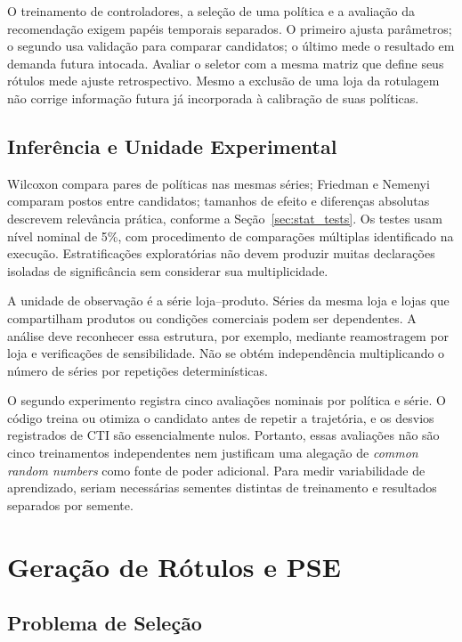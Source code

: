 O treinamento de controladores, a seleção de uma política e a avaliação da recomendação exigem papéis temporais separados. O primeiro ajusta parâmetros; o segundo usa validação para comparar candidatos; o último mede o resultado em demanda futura intocada. Avaliar o seletor com a mesma matriz que define seus rótulos mede ajuste retrospectivo. Mesmo a exclusão de uma loja da rotulagem não corrige informação futura já incorporada à calibração de suas políticas.

\subsection{Inferência e Unidade Experimental}

Wilcoxon compara pares de políticas nas mesmas séries; Friedman e Nemenyi comparam postos entre candidatos; tamanhos de efeito e diferenças absolutas descrevem relevância prática, conforme a Seção~\ref{sec:stat_tests}. Os testes usam nível nominal de 5\%, com procedimento de comparações múltiplas identificado na execução. Estratificações exploratórias não devem produzir muitas declarações isoladas de significância sem considerar sua multiplicidade.

A unidade de observação é a série loja--produto. Séries da mesma loja e lojas que compartilham produtos ou condições comerciais podem ser dependentes. A análise deve reconhecer essa estrutura, por exemplo, mediante reamostragem por loja e verificações de sensibilidade. Não se obtém independência multiplicando o número de séries por repetições determinísticas.

O segundo experimento registra cinco avaliações nominais por política e série. O código treina ou otimiza o candidato antes de repetir a trajetória, e os desvios registrados de CTI são essencialmente nulos. Portanto, essas avaliações não são cinco treinamentos independentes nem justificam uma alegação de \textit{common random numbers} como fonte de poder adicional. Para medir variabilidade de aprendizado, seriam necessárias sementes distintas de treinamento e resultados separados por semente.

\section{Geração de Rótulos e PSE}
\label{sec:selecao_contextual}
\subsection{Problema de Seleção}

